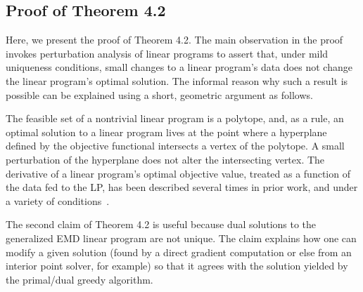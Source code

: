 \subsection{Proof of Theorem 4.2}\label{sec:app-proof}
\label{sec:proofthm}

Here, we present the proof of Theorem 4.2.  The main observation in the proof invokes perturbation analysis \cite{mangasarian1979nonlinear,ferris1991finite} of linear programs to assert that, under mild uniqueness conditions, small changes to a linear program's data does not change the linear program's optimal solution. The informal reason why such a result is possible can be explained using a  short,  geometric argument as follows. 

The feasible set of a nontrivial linear program is a polytope, and, as a rule, an optimal solution to a linear program lives at the point where a hyperplane defined by the objective functional intersects a vertex of the polytope. A small perturbation of the hyperplane does not alter the intersecting vertex. The derivative of a linear program's optimal objective value, treated as a function of the data fed to the LP, has been described several times in prior work, and under a variety of conditions~\cite{dewolf,freund1985postoptimal,agueh2011barycenters,Mills19578MV}.

The second claim of Theorem 4.2 is useful because dual solutions to the generalized EMD linear program are not unique.  The claim explains how one can modify a given solution (found by a direct gradient computation or else from an interior point solver, for example) so that it agrees with the solution yielded by the primal/dual greedy algorithm. 

